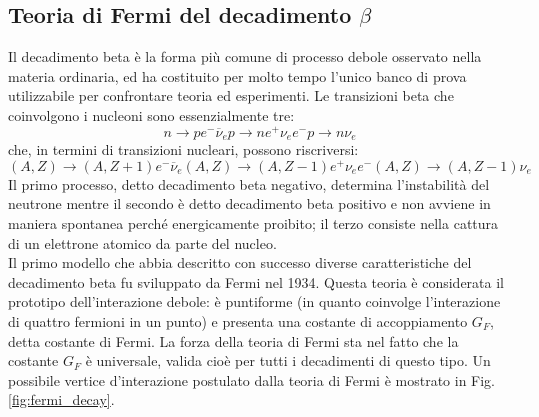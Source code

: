 \documentclass{subnucbo}
\begin{document}
\subsection{Teoria di Fermi del decadimento $\beta$}
\label{subsec:fermi_theory}
Il decadimento beta è la forma più comune di processo debole osservato nella materia ordinaria, ed ha costituito per molto tempo l'unico banco di prova utilizzabile per confrontare teoria ed esperimenti. Le transizioni beta che coinvolgono i nucleoni sono essenzialmente tre:
\begin{subequations}
        \begin{equation}
                n \rightarrow p  e ^ { - }  \overline { \nu } _ { e }
                \label{eq:beta_neg}
        \end{equation}
        \begin{equation}
                p \rightarrow n  e ^ { + }  \nu _ { e }
                \label{eq:beta_pos}
        \end{equation}
        \begin{equation}
                e ^ { - }  p \rightarrow n  \nu _ { e }
                \label{eq:el_capture}
        \end{equation}
\end{subequations}
che, in termini di transizioni nucleari, possono riscriversi:
\begin{subequations}
        \begin{equation}
                ( A , Z ) \rightarrow ( A , Z + 1 )  e ^ { - }  \overline { \nu } _ { e }
                \label{eq:beta_neg_trans}
        \end{equation}
        \begin{equation}
                ( A , Z ) \rightarrow ( A , Z - 1 )  e ^ { + }  \nu _ { e }
                \label{eq:beta_pos_trans}
        \end{equation}
        \begin{equation}
                e ^ { - }  ( A , Z ) \rightarrow ( A , Z - 1 )  \nu _ { e }
                \label{eq:el_capture_trans}
        \end{equation}
\end{subequations}
Il primo processo, detto decadimento beta negativo, determina l'instabilità del neutrone mentre il secondo è detto decadimento beta positivo e non avviene in maniera spontanea perché energicamente proibito; il terzo consiste nella cattura di un elettrone atomico da parte del nucleo. \\
Il primo modello che abbia descritto con successo diverse caratteristiche del decadimento beta fu sviluppato da Fermi nel 1934. Questa teoria è considerata il prototipo dell'interazione debole: è puntiforme (in quanto coinvolge l'interazione di quattro fermioni in un punto) e presenta una costante di accoppiamento $G_{F}$, detta costante di Fermi. La forza della teoria di Fermi sta nel fatto che la costante $G_{F}$ è universale, valida cioè per tutti i decadimenti di questo tipo. Un possibile vertice d'interazione postulato dalla teoria di Fermi è mostrato in Fig. \ref{fig:fermi_decay}.\\
\end{document}
